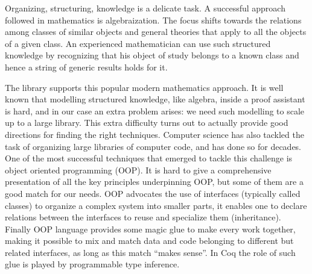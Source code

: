 Organizing, structuring, knowledge is a delicate task. A successful
approach followed in mathematics is algebraization. The focus shifts
towards the relations among classes of similar objects and general
theories that apply to all the objects of a given class.
An experienced mathematician can use such structured
knowledge by recognizing that his object of study belongs to a known
class and hence a string of generic results holds for it.

The \mcbMC{} library supports this popular modern mathematics approach.
It is well known that modelling structured knowledge, like algebra,
inside a proof assistant
is hard, and in our case an extra problem arises: we need such
modelling to scale up to a large library. This extra difficulty turns
out to actually provide good directions for finding the right
techniques.  Computer science has also tackled the task of
organizing large libraries of computer code, and has done so for decades.
One of the most successful techniques that emerged to tackle this challenge
is object oriented programming (OOP).
It is hard to give a comprehensive presentation of all the key
principles underpinning OOP, but some of them are a good match for our needs.
OOP advocates the use of interfaces (typically called classes) to
organize a complex system into smaller parts, it enables one
to declare relations between the interfaces to reuse and
specialize them (inheritance).  Finally OOP language provides some
magic glue to make every work together, making it possible to mix and
match data and code belonging to different but related interfaces, as
long as this match ``makes sense''.  In Coq the role of such glue is
played by programmable type inference.

% 
% 

